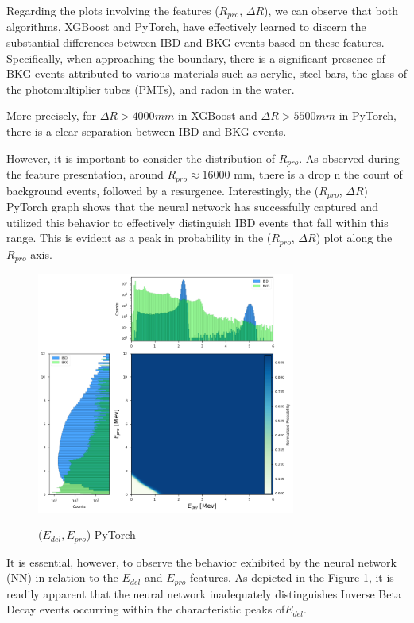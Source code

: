 Regarding the plots involving the features ($R_{pro}$, $\Delta R$), we can observe that both algorithms, XGBoost and PyTorch, have effectively learned to discern the substantial differences between IBD and BKG events based on these features. Specifically, when approaching the boundary, there is a significant presence of BKG events attributed to various materials such as acrylic, steel bars, the glass of the photomultiplier tubes (PMTs), and radon in the water.

More precisely, for $\Delta R > 4000 mm$ in XGBoost and $\Delta R > 5500 mm$ in PyTorch, there is a clear separation between IBD and BKG events.

However, it is important to consider the distribution of $R_{pro}$. As observed during the feature presentation, around $R_{pro} \approx 16000$ mm, there is a drop n the count of background events, followed by a resurgence. 
Interestingly, the ($R_{pro}$, $\Delta R$) PyTorch graph shows that the neural network has successfully captured and utilized this behavior to effectively distinguish IBD events that fall within this range. This is evident as a peak in probability in the ($R_{pro}$, $\Delta R$) plot along the $R_{pro}$ axis.

\begin{figure}
	
	\vspace{-1\baselineskip}
	\caption{($E_{del}, E_{pro}$) PyTorch}
	\vspace{-0.5\baselineskip}
	\includegraphics[width=8.5cm]{Images/e_del_e_pro_pytorch}
	\label{fig:e_del_e_pro_pytorch}
	\vspace{-1\baselineskip}
	
\end{figure}
It is essential, however, to observe the behavior exhibited by the neural network (NN) in relation to the $E_{del}$ and $ E_{pro}$ features. As depicted in the Figure \ref{fig:e_del_e_pro_pytorch}, it is readily apparent that the neural network inadequately distinguishes Inverse Beta Decay events occurring within the characteristic peaks of$ E_{del}$.

